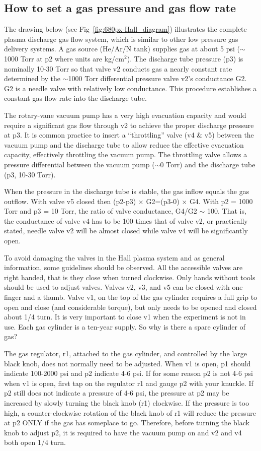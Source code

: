 \documentclass{../lab}
\begin{document}
\subsection{How to set a gas pressure and gas flow rate}

The drawing below (see Fig~\ref{fig:680px-Hall_diagram}) illustrates the complete plasma discharge gas flow system, which is similar to other low pressure gas delivery systems. A gas source (He/Ar/N tank) supplies gas at about 5 psi ($\sim$1000 Torr  at p2 where units are kg/cm$^2$). The discharge tube pressure (p3) is nominally 10-30 Torr so that valve v2 conducts gas a nearly constant rate determined by the $\sim$1000 Torr differential pressure valve v2’s conductance G2. G2 is a needle valve with relatively low conductance. This procedure establishes a constant gas flow rate into the discharge tube.

The rotary-vane vacuum pump has a very high evacuation capacity and would require a significant gas flow through v2 to achieve the proper discharge pressure at p3. It is common practice to insert a ``throttling'' valve (v4 \& v5) between the vacuum pump and the discharge tube to allow reduce the effective evacuation capacity, effectively throttling the vacuum pump. The throttling valve allows a pressure differential between the vacuum pump ($\sim$0 Torr) and the discharge tube (p3, 10-30 Torr).

When the pressure in the discharge tube is stable, the gas inflow equals the gas outflow. With valve v5 closed then (p2-p3) $\times$ G2=(p3-0) $\times$ G4. With p2 = 1000 Torr and p3 = 10 Torr, the ratio of valve conductance, G4/G2 $\sim$ 100. That is, the conductance of valve v4 has to be 100 times that of valve v2, or practically stated, needle valve v2 will be almost closed while valve v4 will be significantly open.

To avoid damaging the valves in the Hall plasma system and as general information, some guidelines should be observed. All the accessible valves are right handed, that is they close when turned clockwise. Only hands without tools should be used to adjust valves. Valves v2, v3, and v5 can be closed with one finger and a thumb. Valve v1, on the top of the gas cylinder requires a full grip to open and close (and considerable torque), but only needs to be opened and closed about 1/4 turn. It is very important to close v1 when the experiment is not in use. Each gas cylinder is a ten-year supply. So why is there a spare cylinder of gas?

The gas regulator, r1, attached to the gas cylinder, and controlled by the large black knob, does not normally need to be adjusted. When v1 is open, p1 should indicate 100-2000 psi and p2 indicate 4-6 psi. If for some reason p2 is not 4-6 psi when v1 is open, first tap on the regulator r1 and gauge p2 with your knuckle. If p2 still does not indicate a pressure of 4-6 psi, the pressure at p2 may be increased by slowly turning the black knob (r1) clockwise. If the pressure is too high, a counter-clockwise rotation of the black knob of r1 will reduce the pressure at p2 ONLY if the gas has someplace to go. Therefore, before turning the black knob to adjust p2, it is required to have the vacuum pump on and v2 and v4 both open 1/4 turn.
\end{document}
